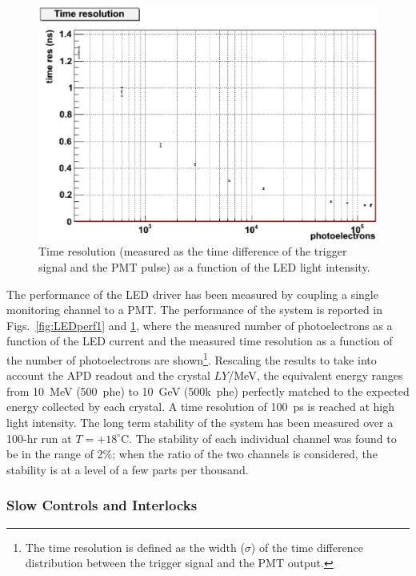 \begin{figure}[th!]
\centering 
\includegraphics[width=1.0\columnwidth]{./fig/timing.eps}
\caption{Time resolution (measured as the time difference of the trigger signal and the PMT pulse) as a function of
  the LED light intensity.}
\label{fig:LEDperf2} 
\end{figure}

The performance of the LED driver has been measured by coupling a single monitoring channel to a PMT. The
performance of the system is reported in Figs.~\ref{fig:LEDperf1} and \ref{fig:LEDperf2}, where the measured
number of photoelectrons as a function of the LED current and the measured time resolution as a function of the
number of photoelectrons are shown\footnote{The time resolution is defined as the width ($\sigma$) of the time
  difference distribution between the trigger signal and the PMT output.}. Rescaling the results to take into account
the APD readout and the crystal $LY$/MeV, the equivalent energy ranges from 10~MeV (500~phe) to 10~GeV
(500k~phe) perfectly matched to the expected energy collected by each crystal. A time resolution of 100~ps is
reached at high light intensity. The long term stability of the system has been measured over a 100-hr run at
$T=+18^\circ$C. The stability of each individual channel was found to be in the range of 2\%; when the ratio of
the two channels is considered, the stability is at a level of a few parts per thousand.

\subsubsection{Slow Controls and Interlocks}

